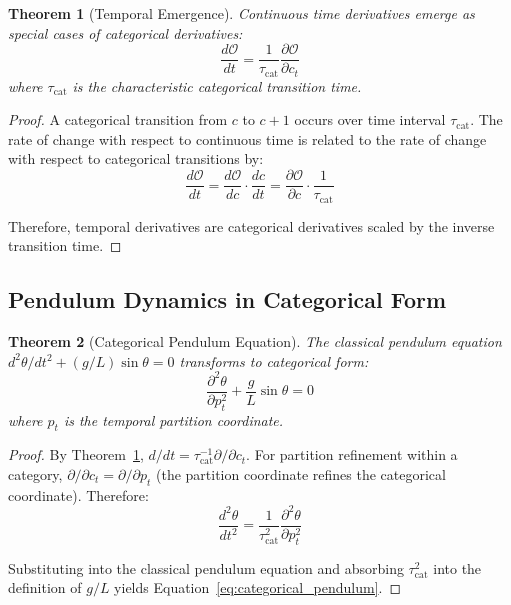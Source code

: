 \documentclass[11pt,twocolumn,a4paper]{article}
\newtheorem{theorem}{Theorem}[section]
\theoremstyle{definition}
\theoremstyle{remark}
\begin{document}
\begin{theorem}[Temporal Emergence]
\label{thm:temporal_emergence}
Continuous time derivatives emerge as special cases of categorical derivatives:
\begin{equation}
\frac{d\mathcal{O}}{dt} = \frac{1}{\tau_{\mathrm{cat}}} \frac{\partial \mathcal{O}}{\partial c_t}
\label{eq:temporal_emergence}
\end{equation}
where $\tau_{\mathrm{cat}}$ is the characteristic categorical transition time.
\end{theorem}

\begin{proof}
A categorical transition from $c$ to $c+1$ occurs over time interval $\tau_{\mathrm{cat}}$. The rate of change with respect to continuous time is related to the rate of change with respect to categorical transitions by:
\begin{equation}
\frac{d\mathcal{O}}{dt} = \frac{d\mathcal{O}}{dc} \cdot \frac{dc}{dt} = \frac{\partial \mathcal{O}}{\partial c} \cdot \frac{1}{\tau_{\mathrm{cat}}}
\end{equation}

Therefore, temporal derivatives are categorical derivatives scaled by the inverse transition time.
\end{proof}

\subsection{Pendulum Dynamics in Categorical Form}

\begin{theorem}[Categorical Pendulum Equation]
\label{thm:categorical_pendulum}
The classical pendulum equation $d^2\theta/dt^2 + (g/L)\sin\theta = 0$ transforms to categorical form:
\begin{equation}
\frac{\partial^2\theta}{\partial p_t^2} + \frac{g}{L}\sin\theta = 0
\label{eq:categorical_pendulum}
\end{equation}
where $p_t$ is the temporal partition coordinate.
\end{theorem}

\begin{proof}
By Theorem~\ref{thm:temporal_emergence}, $d/dt = \tau_{\mathrm{cat}}^{-1} \partial/\partial c_t$. For partition refinement within a category, $\partial/\partial c_t = \partial/\partial p_t$ (the partition coordinate refines the categorical coordinate). Therefore:
\begin{equation}
\frac{d^2\theta}{dt^2} = \frac{1}{\tau_{\mathrm{cat}}^2} \frac{\partial^2\theta}{\partial p_t^2}
\end{equation}

Substituting into the classical pendulum equation and absorbing $\tau_{\mathrm{cat}}^2$ into the definition of $g/L$ yields Equation~\eqref{eq:categorical_pendulum}.
\end{proof}
\end{document}
